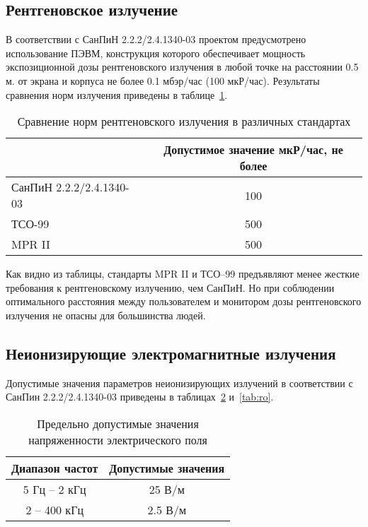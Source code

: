 \subsection{Рентгеновское излучение}

В соответствии с СанПиН 2.2.2/2.4.1340-03 проектом предусмотрено использование ПЭВМ, конструкция которого обеспечивает мощность экспозиционной дозы рентгеновского излучения в любой точке на расстоянии 0.5 м. от экрана и корпуса не более 0.1 мбэр/час (100 мкР/час). Результаты сравнения норм излучения приведены в таблице~\ref{tab:rentgen}.

\begin{table}[ht]
\caption{Сравнение норм рентгеновского излучения в различных стандартах}
\begin{tabular}{|l|c|}
\hline
& Допустимое значение мкР/час, не более \\
\hline
СанПиН 2.2.2/2.4.1340-03 & 100 \\
\hline
ТСО-99 & 500 \\
\hline
MPR II & 500\\
\hline
\end{tabular}
\label{tab:rentgen}
\end{table}

Как видно из таблицы, стандарты MPR II и ТСО--99 предъявляют менее жесткие требования к рентгеновскому излучению, чем СанПиН. Но при соблюдении оптимального расстояния между пользователем и монитором дозы рентгеновского излучения не опасны для большинства людей.

\subsection{Неионизирующие электромагнитные излучения}

Допустимые значения параметров неионизирующих излучений в соответствии с СанПин 2.2.2/2.4.1340-03 приведены в таблицах~\ref{tab:U} и~\ref{tab:ro}.

\begin{table}[ht]
\caption{Предельно допустимые значения напряженности электрического поля}
\begin{tabular}{|c|c|}
\hline
Диапазон частот& Допустимые значения \\
\hline
5 Гц -- 2 кГц & 25 В/м \\
\hline
2 -- 400 кГц& 2.5 В/м \\
\hline
\end{tabular}
\label{tab:U}
\end{table}

